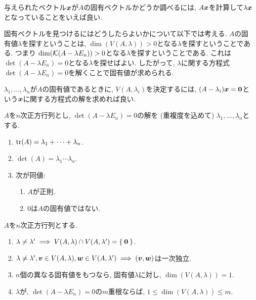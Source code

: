 \begin{remark}
  与えられたベクトル$\boldsymbol{x}$が$A$の固有ベクトルかどうか調べるには,
  $A\boldsymbol{x}$を計算して$\lambda\boldsymbol{x}$となっていることをいえば良い.

  固有ベクトルを見つけるにはどうしたらよいかについて以下では考える.
  $A$の固有値$\lambda$を探すということは,
  $\dim(V(A,\lambda))>0$となる$\lambda$を探すということである.
  つまり
  $\dim(\mathcal{K}(A-\lambda E_n))>0$となる$\lambda$を探すということである.
  これは
  $\det(A-\lambda E_n)=0$となる$\lambda$を探せばよい.
  したがって, $\lambda$に関する方程式
  $\det(A-\lambda E_n)=0$を解くことで固有値が求められる.
  
  $\lambda_1,\ldots,\lambda_n$が$A$の固有値であるときに,
  $V(A,\lambda_i)$を決定するには,
  $(A-\lambda_i)\boldsymbol{x}=\boldsymbol{0}$という$\boldsymbol{x}$に関する方程式の解を求めれば良い.
\end{remark}

\begin{prop}
  $A$を$n$次正方行列とし,
  $\det(A-\lambda E_n)=0$の解を (重複度を込めて)
  $\lambda_1,\ldots,\lambda_n$とする.
  \begin{enumerate}
    \item $\operatorname{tr}(A)=\lambda_1+\cdots+\lambda_n$.
    \item $\det(A)=\lambda_1\cdots\lambda_n$.
    \item 次が同値:
      \begin{enumerate}
      \item $A$が正則.
      \item 0は$A$の固有値ではない.
      \end{enumerate}
  \end{enumerate}
\end{prop}

\begin{prop}
  $A$を$n$次正方行列とする.
  \begin{enumerate}
    \item $\lambda\neq\lambda'\implies V(A,\lambda)\cap V(A,\lambda')=\Set{\boldsymbol{0}}$.
    \item $\lambda\neq\lambda', \boldsymbol{v} \in V(A,\lambda),\boldsymbol{w}\in V(A,\lambda')\implies (\boldsymbol{v},\boldsymbol{w})$は一次独立.
    \item $n$個の異なる固有値をもつなら, 固有値$\lambda$に対し, $\dim(V(A,\lambda))=1$.
    \item $\lambda$が, $\det(A-\lambda E_n)=0$の$m$重根ならば,
      $1\leq \dim(V(A,\lambda))\leq m$.
  \end{enumerate}
  
\end{prop}


